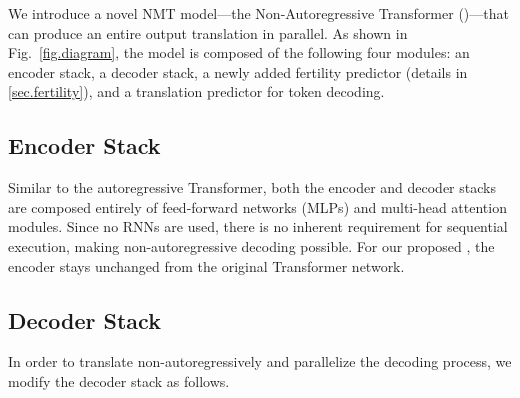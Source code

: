 \documentclass{article} %
\begin{document}
We introduce a novel NMT model---the Non-Autoregressive Transformer (\model)---that can produce an entire output translation in parallel.
As shown in Fig.~\ref{fig.diagram}, the model is composed of the following four modules: 
an encoder stack, 
a decoder stack, 
a newly added fertility predictor (details in \ref{sec.fertility}), and a translation predictor for token decoding. 


\subsection{Encoder Stack}
Similar to the autoregressive Transformer, both the encoder and decoder stacks are composed entirely of feed-forward networks (MLPs) and multi-head attention modules. Since no RNNs are used, there is no inherent requirement for sequential execution, making non-autoregressive decoding possible.
For our proposed \model{}, the encoder stays unchanged from the original Transformer network.

\subsection{Decoder Stack}\label{sec:decoderStack}
In order to translate non-autoregressively and parallelize the decoding process, we modify the decoder stack as follows.

\vspace{-5pt}
\end{document}
